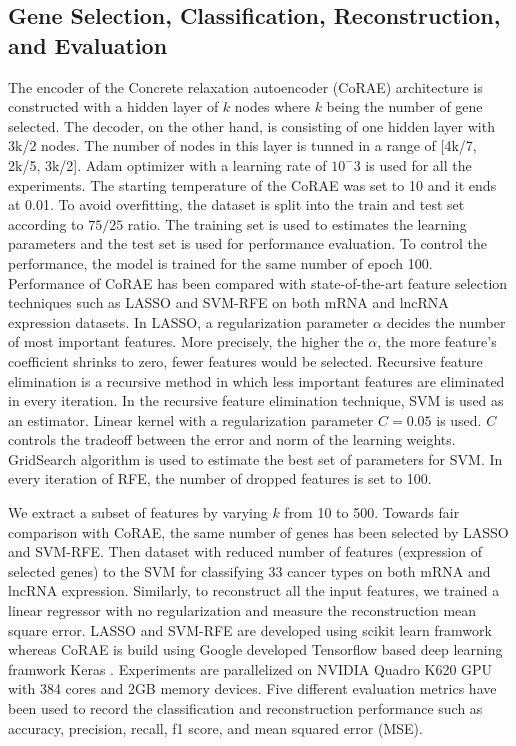 \documentclass{bioinfo}
\begin{document}
{\subsection{Gene Selection, Classification, Reconstruction, and Evaluation} \label{method-details}
The encoder of the Concrete relaxation autoencoder (CoRAE) architecture is constructed with a hidden layer of $k$ nodes where $k$ being the number of gene selected. The decoder, on the other hand, is consisting of one hidden layer with 3k/2 nodes. The number of nodes in this layer is tunned in a range of [4k/7, 2k/5, 3k/2]. Adam optimizer with a learning rate of $10^-3$ is used for all the experiments. The starting temperature of the CoRAE was set to 10 and it ends at 0.01. To avoid overfitting, the dataset is split into the train and test set according to $75/25$ ratio. The training set is used to estimates the learning parameters and the test set is used for performance evaluation. To control the performance, the model is trained for the same number of epoch 100. 
Performance of CoRAE has been compared with state-of-the-art feature selection techniques such as LASSO and SVM-RFE on both mRNA and lncRNA expression datasets. In LASSO, a regularization parameter $\alpha$ decides the number of most important features. More precisely, the higher the $\alpha$, the more feature's coefficient shrinks to zero, fewer features would be selected. Recursive feature elimination is a recursive method in which less important features are eliminated in every iteration. In the recursive feature elimination technique, SVM is used as an estimator. Linear kernel with 
a regularization parameter $C=0.05$ is used. $C$ controls the tradeoff between the error and norm of the learning weights. GridSearch algorithm is used to estimate the best set of parameters for SVM. In every iteration of RFE, the number of dropped features is set to 100. 

We extract a subset of features by varying $k$ from 10 to 500. Towards fair comparison with CoRAE, the same number of genes has been selected by LASSO and SVM-RFE. Then dataset with reduced number of features (expression of selected genes) to the SVM for classifying 33 cancer types on both mRNA and lncRNA expression. Similarly, to reconstruct all the input features, we trained a linear regressor with no regularization and measure the reconstruction mean square error. 
LASSO and SVM-RFE are developed using scikit learn framwork \citep{scikit-learn} whereas CoRAE is build using Google developed Tensorflow \citep{tensorflow2015-whitepaper} based deep learning framwork Keras \citep{chollet2015keras}. Experiments are parallelized on NVIDIA Quadro K620 GPU with 384 cores and 2GB memory devices. Five different evaluation metrics have been used to record the classification and reconstruction performance such as accuracy, precision, recall, f1 score, and mean squared error (MSE). 

}
\end{document}
